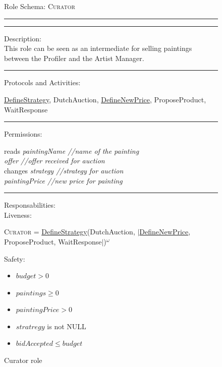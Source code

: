 \documentclass[a4paper,11pt]{report}
\begin{document}
  
  \begin{figure}[ht!]
    \begin{mdframed}
      Role Schema: \textsc{Curator} \\ \hrule \vspace{2pt} \hrule \vspace{10pt}
      Description:\\
      This role can be seen as an intermediate for selling paintings between the Profiler
      and the Artist Manager.
      \\ \hrule \vspace{10pt}
      Protocols and Activities:
      \vspace{-10pt}
      \begin{flushleft}
       \underline{DefineStrategy}, DutchAuction,
       \underline{DefineNewPrice},
       ProposeProduct, WaitResponse
      \end{flushleft}
      \hrule \vspace{10pt}
      Permissions:\\
      \vspace{-15pt}
      \begin{center}
       reads \textit{paintingName //name of the painting}\\
	    \textit{offer //offer received for auction}\\
       changes \textit{strategy //strategy for auction}\\
       \textit{paintingPrice //new price for painting}
      \end{center}
      \hrule \vspace{10pt}
      Responsabilities:\\
      Liveness:
      \begin{flushleft}
      \small\textsc{Curator} = \underline{DefineStrategy}(DutchAuction, $\mid$\underline{DefineNewPrice},
       ProposeProduct, WaitResponse$\mid$)$^\omega$
      \end{flushleft}
      Safety:
      \begin{itemize}
      \itemsep0pt
      \item $budget > 0$
       \item $paintings \geq 0$
       \item $paintingPrice > 0$
       \item $stratregy$ is not NULL
       \item $bidAccepted \leq budget$
      \end{itemize}
    \end{mdframed}
  \caption{Curator role}
  \label{figure:role_curator}
  \end{figure}
  
\end{document}
